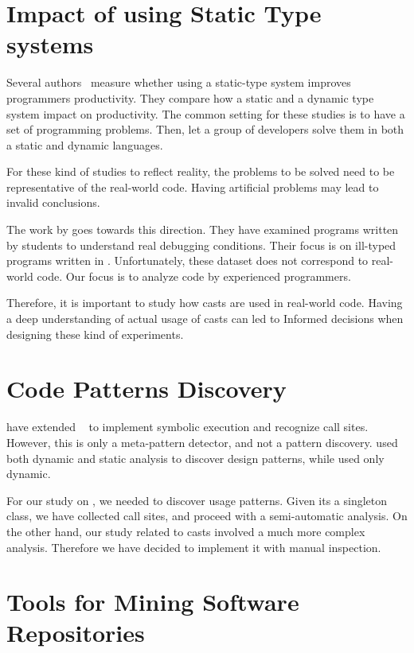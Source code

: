 \section{Impact of using Static Type systems}

Several authors~\cite{stuchlik_static_2011,mayer_empirical_2012,harlin_impact_2017} measure whether using a static-type system improves programmers productivity.
They compare how a static and a dynamic type system impact on productivity.
The common setting for these studies is to have a set of programming problems.
Then, let a group of developers solve them in both a static and dynamic languages.

For these kind of studies to reflect reality, the problems to be solved need to
be representative of the real-world code.
Having artificial problems may lead to invalid conclusions.

The work by \cite{wu_how_2017,wu_learning_2017} goes towards this direction.
They have examined programs written by students to understand real debugging conditions.
Their focus is on ill-typed programs written in \haskell{}.
Unfortunately, these dataset does not correspond to real-world code.
Our focus is to analyze code by experienced programmers.

Therefore, it is important to study how casts are used in real-world code.
Having a deep understanding of actual usage of casts can led to
Informed decisions when designing these kind of experiments.


\section{Code Patterns Discovery} \label{sec:pattern-discovery}

\cite{posnett_thex:_2010} have extended \asm{}~\cite{bruneton_asm:_2002,kuleshov_using_2007} to implement symbolic execution and recognize call sites.
However, this is only a meta-pattern detector, and not a pattern discovery.
\cite{hu_dynamic_2008} used both dynamic and static analysis to discover design patterns, while \cite{arcelli_design_2008} used only dynamic.

For our study on \smu{}, we needed to discover usage patterns.
Given its a singleton class, we have collected call sites,
and proceed with a semi-automatic analysis.
On the other hand, our study related to casts involved a much more complex analysis.
Therefore we have decided to implement it with manual inspection.

\section{Tools for Mining Software Repositories} \label{sec:msr}

